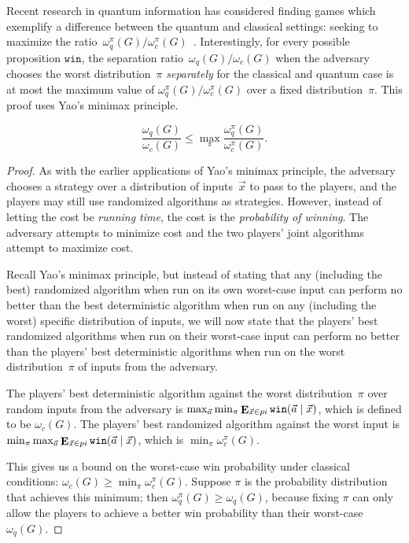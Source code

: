 Recent research in quantum information has considered finding games which exemplify a difference between the quantum and classical settings: seeking to maximize the ratio~$\omega_q^\pi(G) / \omega_c^\pi(G)$~\cite{ABBSSV}. Interestingly, for every possible proposition $\texttt{win}$, the separation ratio~$\omega_q(G) / \omega_c(G)$ when the adversary chooses the worst distribution~$\pi$ \emph{separately} for the classical and quantum case is at most the maximum value of $\omega_q^\pi(G) / \omega_c^\pi(G)$ over a fixed distribution~$\pi$. This proof uses Yao's minimax principle.

\begin{theorem}
	$$\frac{\omega_q(G)}{\omega_c(G)} \leq \max_\pi \frac{\omega_q^\pi(G)}{\omega_c^\pi(G)}.$$
\end{theorem}

\begin{proof}

As with the earlier applications of Yao's minimax principle, the adversary chooses a strategy over a distribution of inputs~$\vec{x}$ to pass to the players, and the players may still use randomized algorithms as strategies. However, instead of letting the cost be \emph{running time}, the cost is the \emph{probability of winning}. The adversary attempts to minimize cost and the two players' joint algorithms attempt to maximize cost.

Recall Yao's minimax principle, but instead of stating that any (including the best) randomized algorithm when run on its own worst-case input can perform no better than the best deterministic algorithm when run on any (including the worst) specific distribution of inputs, we will now state that the players' best randomized algorithms when run on their worst-case input can perform no better than the players' best deterministic algorithms when run on the worst distribution~$\pi$ of inputs from the adversary.

The players' best deterministic algorithm against the worst distribution~$\pi$ over random inputs from the adversary is $\max_{\vec{a}} \min_{\pi} \mathop{\mathbf{E}}_{\vec{x} \in pi} \texttt{win}(\vec{a}\nobreak\mid\nobreak\vec{x})$, which is defined to be $\omega_c(G)$. The players' best randomized algorithm against the worst input is $\min_\pi \max_{\vec{a}} \mathop{\mathbf{E}}_{\vec{x} \in pi} \texttt{win}(\vec{a}\nobreak\mid\nobreak\vec{x})$, which is $\min_\pi \omega^\pi_c(G)$.

This gives us a bound on the worst-case win probability under classical conditions: $\omega_c(G) \geq \min_{\pi} \omega_c^\pi(G)$. Suppose $\pi$ is the probability distribution that achieves this minimum; then $\omega_q^\pi(G) \geq \omega_q(G)$, because fixing $\pi$ can only allow the players to achieve a better win probability than their worst-case $\omega_q(G)$.
\end{proof}

